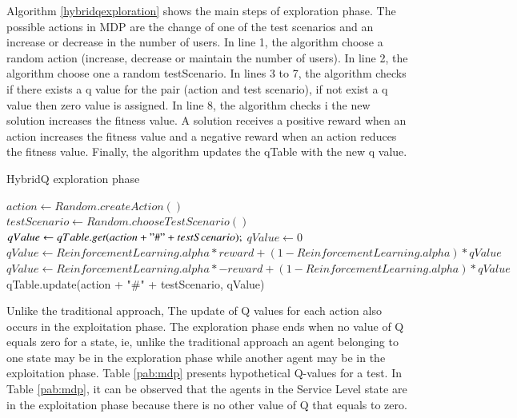 \documentclass[espaco=umemeio,chapter=TITLE,twoside,openright]{abnt}
\begin{document}
Algorithm \ref{hybridqexploration} shows the main steps of exploration phase. The possible actions in MDP are the change of one of the test scenarios and an increase or decrease in the number of users. In line 1, the algorithm choose a random action (increase, decrease or maintain the number of users). In line 2, the algorithm choose one a random testScenario. In lines 3 to 7, the algorithm checks if there exists a q value  for the pair (action and test scenario), if not exist a q value then zero value is assigned. In line 8, the algorithm checks i the new solution increases the fitness value. A solution receives a positive reward when an action increases the fitness value and a negative reward when an action reduces the fitness value.  Finally, the algorithm updates the qTable with the new q value.


\begin{algorithm}[h]
  \caption{HybridQ exploration phase }\label{hybridqexploration}
  \begin{algorithmic}[1]    
    \State $action \gets Random.createAction()$
    \State $testScenario \gets Random.chooseTestScenario()$
    \State $ qValue \gets qTable.get(action + "\#" + testScenario);$
    \Else
        \State $ qValue \gets 0$
    \EndIf
     \State $qValue \gets ReinforcementLearning.alpha * reward + (1 - ReinforcementLearning.alpha) * qValue$     
     \Else
          \State $qValue \gets ReinforcementLearning.alpha * -reward + (1 - ReinforcementLearning.alpha) * qValue$     
    \EndIf     
    \State qTable.update(action + "\#" + testScenario, qValue)    
  \end{algorithmic}
\end{algorithm}

 

Unlike the traditional approach, The update of Q values for each action also occurs in the exploitation phase. The exploration phase ends when no value of Q equals zero for a state, ie, unlike the traditional approach an agent belonging to one state may be in the exploration phase while another agent may be in the exploitation phase. Table \ref{pab:mdp} presents hypothetical Q-values for a test. In Table \ref{pab:mdp}, it can be observed that the agents in the Service Level state are in the exploitation phase because there is no other value of Q that equals to zero.
\end{document}
